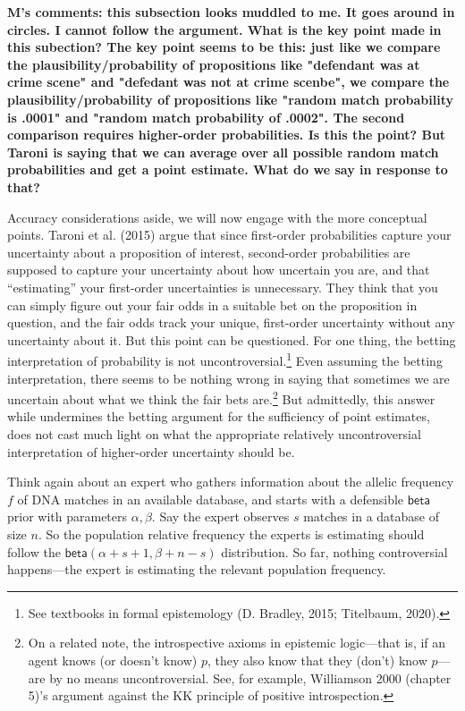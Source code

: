 \documentclass[
  10pt,
  dvipsnames,enabledeprecatedfontcommands]{scrartcl}
\newcommand{\s}[1]{\mbox{$\mathsf{#1}$}}
\begin{document}

\textbf{M's comments: this subsection looks muddled to me. It goes around in circles. I cannot follow the argument. What is the key point made in this subection? The key point seems to be this: just like we compare the plausibility/probability of propositions like "defendant was at crime scene" and "defedant was not at crime scenbe", we compare the plausibility/probability of propositions like "random match probability is .0001" and "random match probability of .0002". The second comparison requires higher-order probabilities. Is this the point? But Taroni is saying that we can average over all possible random match probabilities and get a point estimate. What do we say in response to that?}

Accuracy considerations aside, we will now engage with the more
conceptual points. Taroni et al. (2015) argue that since first-order
probabilities capture your uncertainty about a proposition of interest,
second-order probabilities are supposed to capture your uncertainty
about how uncertain you are, and that ``estimating'' your first-order
uncertainties is unnecessary. They think that you can simply figure out
your fair odds in a suitable bet on the proposition in question, and the
fair odds track your unique, first-order uncertainty without any
uncertainty about it. But this point can be questioned. For one thing,
the betting interpretation of probability is not
uncontroversial.\footnote{See textbooks in formal epistemology (D.
  Bradley, 2015; Titelbaum, 2020).} Even assuming the betting
interpretation, there seems to be nothing wrong in saying that sometimes
we are uncertain about what we think the
fair bets are.\footnote{On a related note, the introspective axioms in
  epistemic logic---that is, if an agent knows (or doesn't know) \(p\),
  they also know that they (don't) know \(p\)---are by no means
  uncontroversial. See, for example, Williamson 2000 (chapter 5)'s
  argument against the KK principle of positive introspection.} But
admittedly, this answer while undermines the betting argument for the
sufficiency of point estimates, does not cast much light on what the
appropriate relatively uncontroversial interpretation of higher-order
uncertainty should be.

Think again about an expert who gathers information about the allelic
frequency \(f\) of DNA matches in an available database, and starts with
a defensible \s{beta} prior with parameters \(\alpha, \beta\). Say the
expert observes \(s\) matches in a database of size \(n\). So the
population relative frequency the experts is estimating should follow
the \(\s{beta}(\alpha + s + 1 ,\beta + n - s)\) distribution. So far,
nothing controversial happens---the expert is estimating the relevant
population frequency.
\end{document}
